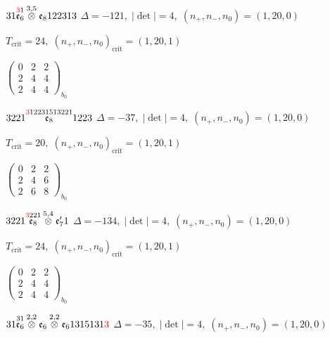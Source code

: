 \documentclass[10pt]{article}
\begin{document}
$31\overset{\textcolor{red}{3}1}{\mathfrak{e}_6}\overset{3,5}{\otimes}\mathfrak{e}_8122313$ \quad $\Delta=-121,\; |\det|=4,\; (n_+,n_-,n_0)=(1,20,0)$

\hspace{1em}$T_{\text{crit}}=24,\; (n_+,n_-,n_0)_{\text{crit}}=(1,20,1)$

\hspace{2em}$\left(\begin{smallmatrix}0 & 2 & 2 \\ 2 & 4 & 4 \\ 2 & 4 & 4\end{smallmatrix}\right)_{\!b_0}$

\smallskip

$3221\overset{\textcolor{red}{3}12231513221}{\mathfrak{e}_8}1223$ \quad $\Delta=-37,\; |\det|=4,\; (n_+,n_-,n_0)=(1,20,0)$

\hspace{1em}$T_{\text{crit}}=20,\; (n_+,n_-,n_0)_{\text{crit}}=(1,20,1)$

\hspace{2em}$\left(\begin{smallmatrix}0 & 2 & 2 \\ 2 & 4 & 6 \\ 2 & 6 & 8\end{smallmatrix}\right)_{\!b_0}$

\smallskip

$3221\overset{\textcolor{red}{3}221}{\mathfrak{e}_8}\overset{5,4}{\otimes}\mathfrak{e}_7'1$ \quad $\Delta=-134,\; |\det|=4,\; (n_+,n_-,n_0)=(1,20,0)$

\hspace{1em}$T_{\text{crit}}=24,\; (n_+,n_-,n_0)_{\text{crit}}=(1,20,1)$

\hspace{2em}$\left(\begin{smallmatrix}0 & 2 & 2 \\ 2 & 4 & 4 \\ 2 & 4 & 4\end{smallmatrix}\right)_{\!b_0}$

\smallskip

$31\overset{31}{\mathfrak{e}_6}\overset{2,2}{\otimes}\mathfrak{e}_6\overset{2,2}{\otimes}\mathfrak{e}_61315131\textcolor{red}{3}$ \quad $\Delta=-35,\; |\det|=4,\; (n_+,n_-,n_0)=(1,20,0)$
\end{document}
